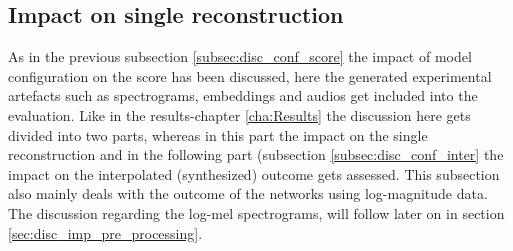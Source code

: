 \subsection{Impact on single reconstruction}
\label{subsec:disc_conf_single_rec}


As in the previous subsection \ref{subsec:disc_conf_score} the impact of model configuration on the score has been discussed, here the generated experimental artefacts such as spectrograms, embeddings and audios get included into the evaluation. Like in the results-chapter \ref{cha:Results} the discussion here gets divided into two parts, whereas in this part the impact on the single reconstruction and in the following part (subsection \ref{subsec:disc_conf_inter} the impact on the interpolated (synthesized) outcome gets assessed. 
This subsection also mainly deals with the outcome of the networks using log-magnitude data. The discussion regarding the log-mel spectrograms, will follow later on in section \ref{sec:disc_imp_pre_processing}.



